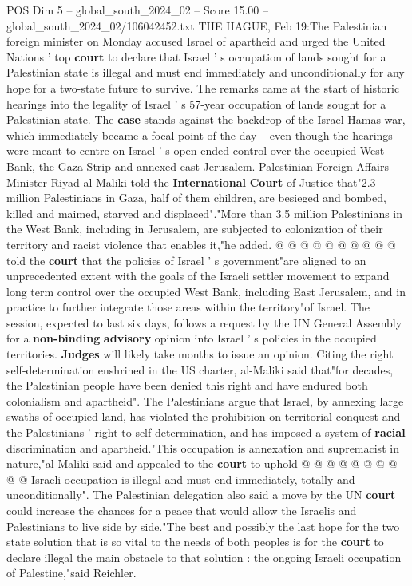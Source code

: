 \begin{textsample}{POS Dim 5 – global\_south\_2024\_02 – Score 15.00 – global\_south\_2024\_02/106042452.txt}  \label{ex:f5_pos_156}
THE HAGUE, Feb 19:The Palestinian foreign minister on Monday accused Israel of apartheid and urged the United Nations ' top \textbf{court} to declare that Israel ' s occupation of lands sought for a Palestinian state is illegal and must end immediately and unconditionally for any hope for a two-state future to survive.
The remarks came at the start of historic hearings into the legality of Israel ' s 57-year occupation of lands sought for a Palestinian state.
The \textbf{case} stands against the backdrop of the Israel-Hamas war, which immediately became a focal point of the day -- even though the hearings were meant to centre on Israel ' s open-ended control over the occupied West Bank, the Gaza Strip and annexed east Jerusalem.
Palestinian Foreign Affairs Minister Riyad al-Maliki told the \textbf{International} \textbf{Court} of Justice that"2.3 million Palestinians in Gaza, half of them children, are besieged and bombed, killed and maimed, starved and displaced"."More than 3.5 million Palestinians in the West Bank, including in Jerusalem, are subjected to colonization of their territory and racist violence that enables it,"he added. @ @ @ @ @ @ @ @ @ @ told the \textbf{court} that the policies of Israel ' s government"are aligned to an unprecedented extent with the goals of the Israeli settler movement to expand long term control over the occupied West Bank, including East Jerusalem, and in practice to further integrate those areas within the territory"of Israel.
The session, expected to last six days, follows a request by the UN General Assembly for a \textbf{non-binding} \textbf{advisory} opinion into Israel ' s policies in the occupied territories. \textbf{Judges} will likely take months to issue an opinion.
Citing the right self-determination enshrined in the US charter, al-Maliki said that"for decades, the Palestinian people have been denied this right and have endured both colonialism and apartheid".
The Palestinians argue that Israel, by annexing large swaths of occupied land, has violated the prohibition on territorial conquest and the Palestinians ' right to self-determination, and has imposed a system of \textbf{racial} discrimination and apartheid."This occupation is annexation and supremacist in nature,"al-Maliki said and appealed to the \textbf{court} to uphold @ @ @ @ @ @ @ @ @ @ Israeli occupation is illegal and must end immediately, totally and unconditionally".
The Palestinian delegation also said a move by the UN \textbf{court} could increase the chances for a peace that would allow the Israelis and Palestinians to live side by side."The best and possibly the last hope for the two state solution that is so vital to the needs of both peoples is for the \textbf{court} to declare illegal the main obstacle to that solution : the ongoing Israeli occupation of Palestine,"said Reichler.

\end{textsample}
